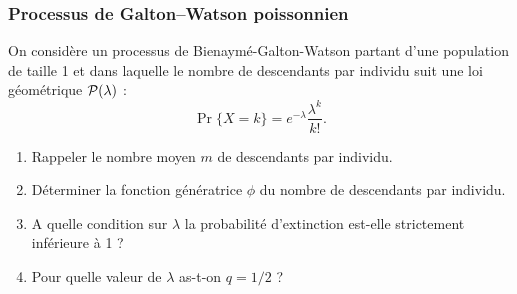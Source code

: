 \subsubsection{Processus de Galton–Watson poissonnien} %
  On considère un processus de Bienaymé-Galton-Watson partant d'une population de taille 1 et dans laquelle le nombre de descendants par individu suit une loi géométrique $\mathcal{P}(\lambda)$ :
  $$
  \Pr\{X = k\} = e^{-\lambda} \frac{\lambda^k}{k!}.
  $$
  \begin{enumerate}
    \item Rappeler le nombre moyen $m$ de descendants par individu.
    \item Déterminer la fonction génératrice $\phi$ du nombre de descendants par individu.
    \item A quelle condition sur $\lambda$ la probabilité d'extinction est-elle strictement inférieure à 1 ?
    \item Pour quelle valeur de $\lambda$ as-t-on $q = 1/2$ ?
  \end{enumerate}
